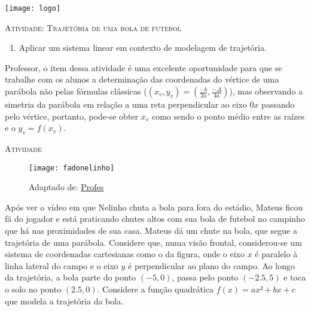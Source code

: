 \documentclass[10 pt,usenames,dvipsnames, oneside]{article}
\begin{document}
\begin{center}
  \begin{minipage}[l]{3cm}
\texttt{[image: logo]}    
\end{minipage}\hfill
\begin{minipage}[r]{.8\textwidth}
 {\Large \scshape Atividade: Trajetória de uma bola de futebol}  
\end{minipage}
\end{center}
\vspace{.2cm}

\ifdefined\prof

\begin{goals}
\begin{enumerate}
\item Aplicar um sistema linear em contexto de modelagem de trajetória.
\end{enumerate}

\tcblower

Professor, o item  dessa atividade é uma excelente oportunidade para que se trabalhe com os alunos a determinação das coordenadas do vértice de uma parábola não pelas fórmulas clássicas ($(x_v,y_v)=(\frac{-b}{2a}, \frac{-\Delta}{4a})$), mas observando a simetria da parábola em relação a uma reta perpendicular ao eixo $0x$ passando pelo vértice, portanto, pode-se obter $x_v$ como sendo o ponto médio entre as raízes e o $y_v=f(x_v)$. 

\end{goals}

\bigskip
\begin{center}
{\large \scshape Atividade}
\end{center}
\fi

\begin{figure}[H]
\centering
\noindent\texttt{[image: fadonelinho]}
\caption{Adaptado de: \href{https://profes.com.br/felipes.rocha/blog/lancamento-obliquo-e-o-futebol}{Profes}}
\end{figure}

Após ver o vídeo em que Nelinho chuta a bola para fora do estádio, Mateus ficou fã do jogador e está praticando chutes altos com sua bola de futebol no campinho que há nas proximidades de sua casa. Mateus dá um chute na bola, que segue a trajetória de uma parábola. Considere que, numa visão frontal, considerou-se um sistema de coordenadas cartesianas como o da figura, onde o eixo $x$ é paralelo à linha lateral do campo e o eixo $y$ é perpendicular ao plano do campo. Ao longo da trajetória, a bola parte do ponto $(-5,0)$, passa pelo ponto $(-2.5, 5)$ e toca o solo no ponto $(2.5, 0)$. Considere a função quadrática $f(x) = ax²+bx+c$ que modela a trajetória da bola.
\end{document}
